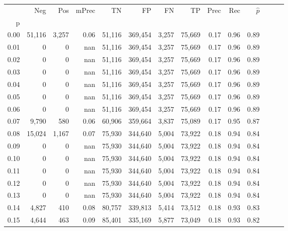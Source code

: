 \begin{tabular}{rrrrrrrrrrrrrr}
\toprule
{} &     Neg &    Pos & mPrec &       TN &       FP &      FN &      TP &  Prec &   Rec & $\hat{p}$ \\
p    &         &        &       &          &          &         &         &       &       &           \\
\midrule
0.00 &  51,116 &  3,257 &  0.06 &   51,116 &  369,454 &   3,257 &  75,669 &  0.17 &  0.96 &      0.89 \\
0.01 &       0 &      0 &   nan &   51,116 &  369,454 &   3,257 &  75,669 &  0.17 &  0.96 &      0.89 \\
0.02 &       0 &      0 &   nan &   51,116 &  369,454 &   3,257 &  75,669 &  0.17 &  0.96 &      0.89 \\
0.03 &       0 &      0 &   nan &   51,116 &  369,454 &   3,257 &  75,669 &  0.17 &  0.96 &      0.89 \\
0.04 &       0 &      0 &   nan &   51,116 &  369,454 &   3,257 &  75,669 &  0.17 &  0.96 &      0.89 \\
0.05 &       0 &      0 &   nan &   51,116 &  369,454 &   3,257 &  75,669 &  0.17 &  0.96 &      0.89 \\
0.06 &       0 &      0 &   nan &   51,116 &  369,454 &   3,257 &  75,669 &  0.17 &  0.96 &      0.89 \\
0.07 &   9,790 &    580 &  0.06 &   60,906 &  359,664 &   3,837 &  75,089 &  0.17 &  0.95 &      0.87 \\
0.08 &  15,024 &  1,167 &  0.07 &   75,930 &  344,640 &   5,004 &  73,922 &  0.18 &  0.94 &      0.84 \\
0.09 &       0 &      0 &   nan &   75,930 &  344,640 &   5,004 &  73,922 &  0.18 &  0.94 &      0.84 \\
0.10 &       0 &      0 &   nan &   75,930 &  344,640 &   5,004 &  73,922 &  0.18 &  0.94 &      0.84 \\
0.11 &       0 &      0 &   nan &   75,930 &  344,640 &   5,004 &  73,922 &  0.18 &  0.94 &      0.84 \\
0.12 &       0 &      0 &   nan &   75,930 &  344,640 &   5,004 &  73,922 &  0.18 &  0.94 &      0.84 \\
0.13 &       0 &      0 &   nan &   75,930 &  344,640 &   5,004 &  73,922 &  0.18 &  0.94 &      0.84 \\
0.14 &   4,827 &    410 &  0.08 &   80,757 &  339,813 &   5,414 &  73,512 &  0.18 &  0.93 &      0.83 \\
0.15 &   4,644 &    463 &  0.09 &   85,401 &  335,169 &   5,877 &  73,049 &  0.18 &  0.93 &      0.82 \\

\end{tabular}
